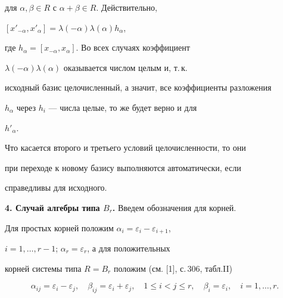 для $\alpha,\beta\in R$ с $\alpha+\beta\in R$. Действительно,


$[x'_{-\alpha},x'_\alpha]=\lambda(-\alpha)\lambda(\alpha)h_\alpha$,


где $h_\alpha=[x_{-\alpha},x_\alpha]$. Во всех случаях коэффициент


$\lambda(-\alpha)\lambda(\alpha)$ оказывается числом целым и, т.\,к.


исходный базис целочисленный, а значит, все коэффициенты разложения


$h_\alpha$ через $h_i$ --- числа целые, то же будет верно и для


$h'_\alpha$.





Что касается второго и третьего условий целочисленности, то они


при переходе к новому базису выполняются автоматически, если


справедливы для исходного.


\medskip





{\bf 4. Случай алгебры типа $B_r$.} Введем обозначения для корней.


Для простых корней положим $\alpha_i=\varepsilon_i-\varepsilon_{i+1}$,


$i=1,\dotsc,r-1$; $\alpha_r=\varepsilon_r$, а для положительных


корней системы типа $R=B_r$ положим (см. [1], с.\,306, табл.\;II)


$$


\alpha_{ij}=\varepsilon_i-\varepsilon_j,\quad


\beta_{ij}=\varepsilon_i+\varepsilon_j,\quad 1\le i<j\le r,\quad


\beta_i=\varepsilon_i,\quad  i=1,\dotsc,r.


$$





